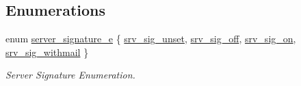 \subsection*{Enumerations}
\begin{DoxyCompactItemize}
\item 
enum \hyperlink{group__APACHE__CORE__HTTPD_ga3d3075ad369a3acb6892c3e3c3aab522}{server\+\_\+signature\+\_\+e} \{ \hyperlink{group__APACHE__CORE__HTTPD_gga3d3075ad369a3acb6892c3e3c3aab522abba0ee02f0562e1450d93d82b43a8dda}{srv\+\_\+sig\+\_\+unset}, 
\hyperlink{group__APACHE__CORE__HTTPD_gga3d3075ad369a3acb6892c3e3c3aab522a810a2e088591e32ed7bc085c054f0164}{srv\+\_\+sig\+\_\+off}, 
\hyperlink{group__APACHE__CORE__HTTPD_gga3d3075ad369a3acb6892c3e3c3aab522a762f2f5fe4cf230e5d6f397af9746a58}{srv\+\_\+sig\+\_\+on}, 
\hyperlink{group__APACHE__CORE__HTTPD_gga3d3075ad369a3acb6892c3e3c3aab522aebf94cdeb9f0ac0e9a331dbbf916fdd2}{srv\+\_\+sig\+\_\+withmail}
 \}\begin{DoxyCompactList}\small\item\em Server Signature Enumeration. \end{DoxyCompactList}
\end{DoxyCompactItemize}
